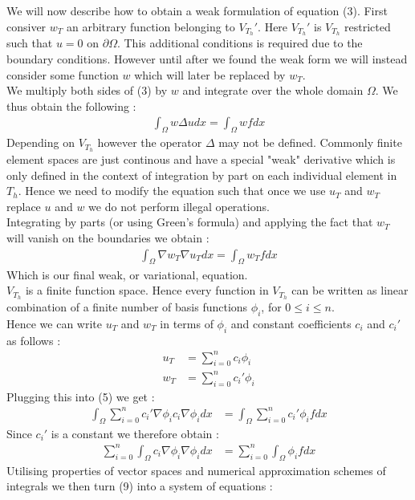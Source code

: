 \documentclass[11pt,twoside,a4paper]{article}
\begin{document}
We will now describe how to obtain a weak formulation of equation (3). First consiver $w_T$ an arbitrary function belonging to $V_{T_h} '$. Here $V_{T_h} '$ is $V_{T_h}$ restricted such that $u = 0$ on $\partial \Omega$. This additional conditions is required due to the boundary conditions. However until after we found the weak form we will instead consider some function $w$ which will later be replaced by $w_T$.\\
We multiply both sides of (3) by $w$ and integrate over the whole domain $\Omega$. We thus obtain the following :
\begin{align}
\int_\Omega w \Delta u dx= \int_\Omega w f dx
\end{align}
 Depending on $V_{T_h}$ however the operator $\Delta$ may not be defined. Commonly finite element spaces are just continous and have a special "weak" derivative which is only defined in the context of integration by part on each individual element in $T_h$. Hence we need to modify the equation  such that once we use $u_T$ and $w_T$ replace $u$ and $w$ we do not perform illegal operations.\\
Integrating by parts (or using Green's formula) and applying the fact that $w_T$ will vanish on the boundaries we obtain : 
\begin{align}
\int_\Omega \nabla w_T \nabla u_T dx= \int_\Omega w_T f dx
\end{align}
Which is our final weak, or variational, equation.\\
$V_{T_h}$ is a finite function space. Hence every function in $V_{T_h}$ can be written as linear combination of a finite number of basis functions $\phi_i$, for $0 \leq i \leq n$.\\
Hence we can write $u_T$ and $w_T$ in terms of $\phi_i$ and constant coefficients $c_i$ and $c_i'$  as follows :
\begin{align}
u_T &= \sum_{i=0}^n c_i \phi_i \\
w_T &= \sum_{i=0}^n c_i' \phi_i
\end{align}
Plugging this into (5) we get :
\begin{align}
\int_\Omega \sum_{i=0}^n c_i' \nabla \phi_i c_i \nabla \phi_i dx&= \int_\Omega \sum_{i=0}^n c_i' \phi_i f dx
\end{align}
Since $c_i'$ is a constant we therefore obtain :
\begin{align}
\sum_{i=0}^n\int_\Omega c_i  \nabla \phi_i \nabla \phi_i dx&= \sum_{i=0}^n \int_\Omega \phi_i f dx
\end{align}
Utilising properties of vector spaces and numerical approximation schemes of integrals we then turn (9) into a system of equations :
\end{document}
